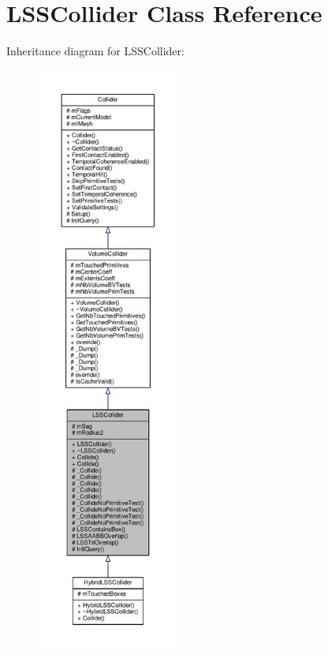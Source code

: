 \hypertarget{classLSSCollider}{}\section{L\+S\+S\+Collider Class Reference}
\label{classLSSCollider}


Inheritance diagram for L\+S\+S\+Collider\+:
\nopagebreak
\begin{figure}[H]
\begin{center}
\leavevmode
\includegraphics[height=550pt]{d7/d11/classLSSCollider__inherit__graph}
\end{center}
\end{figure}


